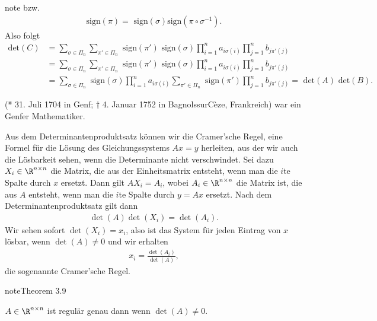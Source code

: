 \documentclass[letterpaper,10pt,english]{jupyterBook}
\begin{document}
\begin{sphinxadmonition}{note}
bzw.
\begin{equation*}
\begin{split}  \text{sign}(\pi ) = \text{ sign}(\sigma)  \text{sign}(\pi \circ \sigma^{-1}).\end{split}
\end{equation*}
Also folgt
\begin{align*} \text{det}(C) &=  \sum_{\sigma \in \Pi_n} \sum_{\pi' \in \Pi_n} \text{ sign}(\pi') \text{ sign}(\sigma) \prod_{i=1}^n  a_{i\sigma(i)} \prod_{j=1}^n  b_{j \pi'(j)} \\  &= \sum_{\sigma \in \Pi_n} \sum_{\pi' \in \Pi_n} \text{ sign}(\pi') \text{ sign}(\sigma) \prod_{i=1}^n  a_{i\sigma(i)} \prod_{j=1}^n  b_{j \pi'(j)}  \\  &= \sum_{\sigma \in \Pi_n} \text{ sign}(\sigma) \prod_{i=1}^n  a_{i\sigma(i)} \sum_{\pi' \in \Pi_n} \text{ sign}(\pi')   \prod_{j=1}^n  b_{j \pi'(j)}  = \text{ det}(A) \text{ det}(B). \end{align*}\end{sphinxadmonition}

\begin{sphinxShadowBox}

 (* 31. Juli 1704 in Genf; † 4. Januar 1752 in Bagnols\sphinxhyphen{}sur\sphinxhyphen{}Cèze, Frankreich) war ein Genfer Mathematiker.
\end{sphinxShadowBox}

Aus dem Determinantenproduktsatz können wir die Cramer’sche Regel, eine Formel für die Lösung des Gleichungssystems \(Ax=y\) herleiten, aus der wir auch die Lösbarkeit sehen, wenn die Determinante nicht verschwindet. Sei dazu \(X_i \in \R^{n \times n}\) die Matrix, die aus der Einheitsmatrix entsteht, wenn man die \(i\)\sphinxhyphen{}te Spalte durch \(x\) ersetzt. Dann gilt \(A X_i = A_i\), wobei \(A_i \in \R^{n \times n}\) die Matrix ist, die aus \(A\) entsteht, wenn man die \(i\)\sphinxhyphen{}te Spalte durch \(y=Ax\) ersetzt.  Nach dem Determinantenproduktsatz gilt dann
\begin{equation*}
\begin{split} \det(A) \det(X_i) = \det(A_i).\end{split}
\end{equation*}
Wir sehen sofort \(\det(X_i)=x_i\), also ist das System für jeden Eintrag von \(x\) lösbar, wenn \(\det(A)\neq 0\) und wir erhalten
\begin{equation*}
\begin{split} x_i = \frac{\det(A_i)}{\det(A)},\end{split}
\end{equation*}
die sogenannte Cramer’sche Regel.
\label{vektorraeume/LGS:theorem-18}
\begin{sphinxadmonition}{note}{Theorem 3.9}



\(A \in \R^{n \times n}\) ist regulär genau dann wenn \(\det(A)\neq 0\).
\end{sphinxadmonition}
\end{document}
